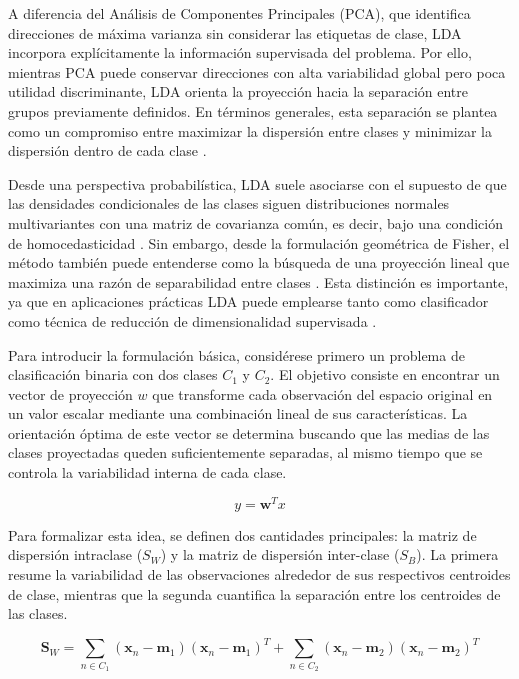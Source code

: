 A diferencia del Análisis de Componentes Principales (PCA), que identifica direcciones de máxima varianza sin considerar las etiquetas de clase, LDA incorpora explícitamente la información supervisada del problema. Por ello, mientras PCA puede conservar direcciones con alta variabilidad global pero poca utilidad discriminante, LDA orienta la proyección hacia la separación entre grupos previamente definidos. En términos generales, esta separación se plantea como un compromiso entre maximizar la dispersión entre clases y minimizar la dispersión dentro de cada clase \cite{bishop2006pattern}.

Desde una perspectiva probabilística, LDA suele asociarse con el supuesto de que las densidades condicionales de las clases siguen distribuciones normales multivariantes con una matriz de covarianza común, es decir, bajo una condición de homocedasticidad \cite{mclachlan1992discriminant}. Sin embargo, desde la formulación geométrica de Fisher, el método también puede entenderse como la búsqueda de una proyección lineal que maximiza una razón de separabilidad entre clases \cite{fisher1936use}. Esta distinción es importante, ya que en aplicaciones prácticas LDA puede emplearse tanto como clasificador como técnica de reducción de dimensionalidad supervisada \cite{martinez2001pca}.

Para introducir la formulación básica, considérese primero un problema de clasificación binaria con dos clases $C_1$ y $C_2$. El objetivo consiste en encontrar un vector de proyección $w$ que transforme cada observación del espacio original en un valor escalar mediante una combinación lineal de sus características. La orientación óptima de este vector se determina buscando que las medias de las clases proyectadas queden suficientemente separadas, al mismo tiempo que se controla la variabilidad interna de cada clase.

\begin{equation}
	y = \mathbf{w}^Tx
	\label{eq:EMT 1}
\end{equation}

Para formalizar esta idea, se definen dos cantidades principales: la matriz de dispersión intraclase ($S_W$) y la matriz de dispersión inter-clase ($S_B$). La primera resume la variabilidad de las observaciones alrededor de sus respectivos centroides de clase, mientras que la segunda cuantifica la separación entre los centroides de las clases. 

\begin{equation}
	\mathbf{S}_W = \sum_{n \in C_1} (\mathbf{x}_n - \mathbf{m}_1)(\mathbf{x}_n - \mathbf{m}_1)^T + \sum_{n \in C_2} (\mathbf{x}_n - \mathbf{m}_2)(\mathbf{x}_n - \mathbf{m}_2)^T
	\label{eq:EMT2}
\end{equation}

